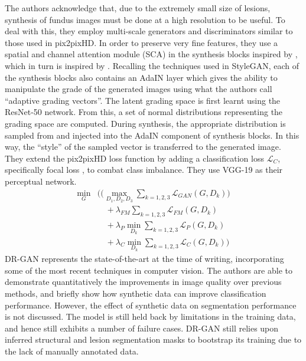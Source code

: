 The authors acknowledge that, due to the extremely small size of lesions, synthesis of fundus images must be done at a high resolution to be useful.
To deal with this, they employ multi-scale generators and discriminators similar to those used in pix2pixHD. 
In order to preserve very fine features, they use a spatial and channel attention module (SCA) in the synthesis blocks inspired by \cite{sca1}, which in turn is inspired by \cite{sca2}.
Recalling the techniques used in StyleGAN, each of the synthesis blocks also contains an AdaIN layer which gives the ability to manipulate the grade of the generated images using what the authors call ``adaptive grading vectors''.
The latent grading space is first learnt using the ResNet-50 network.
From this, a set of normal distributions representing the grading space are computed.
During synthesis, the appropriate distribution is sampled from and injected into the AdaIN component of synthesis blocks.
In this way, the ``style'' of the sampled vector is transferred to the generated image. 
They extend the pix2pixHD loss function by adding a classification loss $\mathcal{L}_C$, specifically focal loss \cite{focal}, to combat class imbalance. They use VGG-19 as their perceptual network.
\begin{equation}
\begin{split}
    \min_G & \Bigg(\bigg( \max_{D_1, D_2, D_3} \sum_{k=1, 2, 3} \mathcal{L}_{GAN} (G, D_k) \bigg) \\
           &\quad + \lambda_{FM} \sum_{k=1, 2, 3} \mathcal{L}_{FM} (G, D_k) \\
           &\quad + \lambda_{P} \min_{D_k} \sum_{k=1, 2, 3} \mathcal{L}_{P} (G, D_k) \\
           &\quad + \lambda_{C} \min_{D_k} \sum_{k=1, 2, 3} \mathcal{L}_{C} (G, D_k) \Bigg)
\end{split}
\end{equation}
DR-GAN represents the state-of-the-art at the time of writing, incorporating some of the most recent techniques in computer vision.
The authors are able to demonstrate quantitatively the improvements in image quality over previous methods, and briefly show how synthetic data can improve classification performance. However, the effect of synthetic data on segmentation performance is not discussed. The model is still held back by limitations in the training data, and hence still exhibits a number of failure cases. DR-GAN still relies upon inferred structural and lesion segmentation masks to bootstrap its training due to the lack of manually annotated data. 

